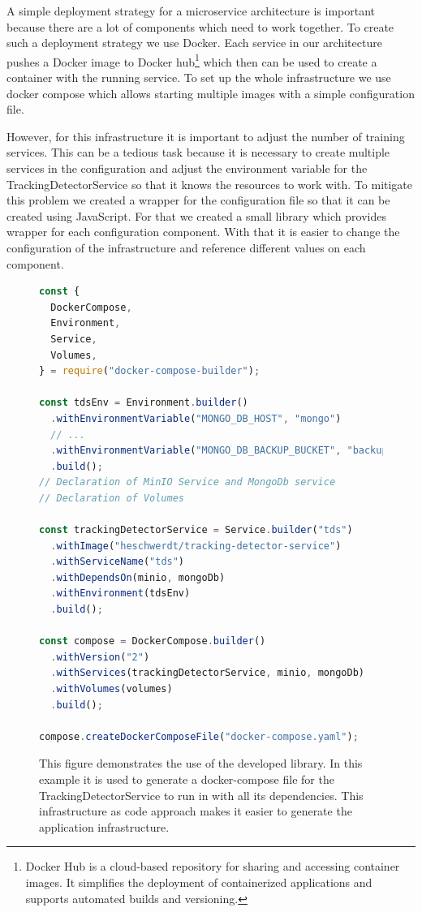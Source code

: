 A simple deployment strategy for a microservice architecture is important because there are a lot of components which need to work
together. To create such a deployment strategy we use Docker. Each service in our architecture
pushes a Docker image to Docker hub\footnote{Docker Hub is a cloud-based repository for sharing and accessing container images.
It simplifies the deployment of containerized applications and supports automated builds and versioning.} which then can be used 
to create a container with the running service. To set up the whole
infrastructure we use docker compose which allows starting multiple images with a simple configuration file. 

However, for this infrastructure it is important to adjust the number of training services. This can be a tedious task because 
it is necessary to create multiple services in the configuration and adjust the environment variable for the TrackingDetectorService so that
it knows the resources to work with. To mitigate this problem we created a wrapper for the configuration file so that it can
be created using JavaScript. For that we created a small library which provides wrapper for each configuration component. With 
that it is easier
to change the configuration of the infrastructure and reference different values on each component.

\begin{figure}[ht!]
\begin{lstlisting}[language=JavaScript]
const {
  DockerCompose,
  Environment,
  Service,
  Volumes,
} = require("docker-compose-builder");

const tdsEnv = Environment.builder()
  .withEnvironmentVariable("MONGO_DB_HOST", "mongo")
  // ...
  .withEnvironmentVariable("MONGO_DB_BACKUP_BUCKET", "backup")
  .build();
// Declaration of MinIO Service and MongoDb service
// Declaration of Volumes

const trackingDetectorService = Service.builder("tds")
  .withImage("heschwerdt/tracking-detector-service")
  .withServiceName("tds")
  .withDependsOn(minio, mongoDb)
  .withEnvironment(tdsEnv)
  .build();

const compose = DockerCompose.builder()
  .withVersion("2")
  .withServices(trackingDetectorService, minio, mongoDb)
  .withVolumes(volumes)
  .build();

compose.createDockerComposeFile("docker-compose.yaml");
\end{lstlisting}
\caption{This figure demonstrates the use of the developed library. In this example it is used to generate a docker-compose file
for the TrackingDetectorService to run in with all its dependencies. This infrastructure as code approach makes it easier to
generate the application infrastructure.
}
\label{fig:DockerCompose}
\end{figure}

